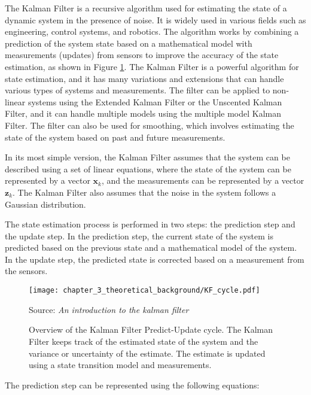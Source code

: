 The Kalman Filter \cite{kalman1960new} is a recursive algorithm used for estimating the state of a dynamic system in the presence of noise. It is widely used in various fields such as engineering, control systems, and robotics. The algorithm works by combining a prediction of the system state based on a mathematical model with measurements (updates) from sensors to improve the accuracy of the state estimation, as shown in Figure \ref{fig:chapter_3_theoretical_background/KF_cycle}. The Kalman Filter is a powerful algorithm for state estimation, and it has many variations and extensions that can handle various types of systems and measurements. The filter can be applied to non-linear systems using the Extended Kalman Filter or the Unscented Kalman Filter, and it can handle multiple models using the multiple model Kalman Filter. The filter can also be used for smoothing, which involves estimating the state of the system based on past and future measurements.

In its most simple version, the Kalman Filter assumes that the system can be described using a set of linear equations, where the state of the system can be represented by a vector $\mathbf{x}_k$, and the measurements can be represented by a vector $\mathbf{z}_k$. The Kalman Filter also assumes that the noise in the system follows a Gaussian distribution.

The state estimation process is performed in two steps: the prediction step and the update step. In the prediction step, the current state of the system is predicted based on the previous state and a mathematical model of the system. In the update step, the predicted state is corrected based on a measurement from the sensors.

\begin{figure}[!h]
	\centering
	\captionsetup{justification=justified}
	\texttt{[image: chapter\_3\_theoretical\_background/KF\_cycle.pdf]}
	\caption[Overview of the Kalman Filter Predict-Update cycle]{Overview of the Kalman Filter Predict-Update cycle. The Kalman Filter keeps track of the estimated state of the system and the variance or uncertainty of the estimate. The estimate is updated using a state transition model and measurements.}
	Source: \textit{An introduction to the kalman filter} \cite{bishop2001introduction}
	\label{fig:chapter_3_theoretical_background/KF_cycle}
\end{figure}

The prediction step can be represented using the following equations:

